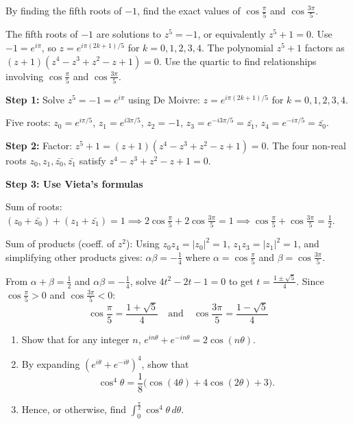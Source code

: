 \begin{problem}
By finding the fifth roots of $-1$, find the exact values of $\cos\frac{\pi}{5}$ and $\cos\frac{3\pi}{5}$.
\end{problem}

\begin{hint}
The fifth roots of $-1$ are solutions to $z^5 = -1$, or equivalently $z^5 + 1 = 0$. Use $-1 = e^{i\pi}$, so $z = e^{i\pi(2k+1)/5}$ for $k = 0, 1, 2, 3, 4$. The polynomial $z^5 + 1$ factors as $(z+1)(z^4 - z^3 + z^2 - z + 1) = 0$. Use the quartic to find relationships involving $\cos\frac{\pi}{5}$ and $\cos\frac{3\pi}{5}$.
\end{hint}

\begin{solution}[Sketch]
\textbf{Step 1:} Solve $z^5=-1=e^{i\pi}$ using De Moivre: $z=e^{i\pi(2k+1)/5}$ for $k=0,1,2,3,4$.

Five roots: $z_0=e^{i\pi/5}$, $z_1=e^{i3\pi/5}$, $z_2=-1$, $z_3=e^{-i3\pi/5}=\bar{z_1}$, $z_4=e^{-i\pi/5}=\bar{z_0}$.

\textbf{Step 2:} Factor: $z^5+1=(z+1)(z^4-z^3+z^2-z+1)=0$. The four non-real roots $z_0,z_1,\bar{z_0},\bar{z_1}$ satisfy $z^4-z^3+z^2-z+1=0$.

\textbf{Step 3: Use Vieta's formulas}

Sum of roots: $(z_0+\bar{z_0})+(z_1+\bar{z_1})=1 \implies 2\cos\frac{\pi}{5}+2\cos\frac{3\pi}{5}=1 \implies \cos\frac{\pi}{5}+\cos\frac{3\pi}{5}=\frac{1}{2}$.

Sum of products (coeff. of $z^2$): Using $z_0z_4=|z_0|^2=1$, $z_1z_3=|z_1|^2=1$, and simplifying other products gives: $\alpha\beta=-\frac{1}{4}$ where $\alpha=\cos\frac{\pi}{5}$ and $\beta=\cos\frac{3\pi}{5}$.

From $\alpha+\beta=\frac{1}{2}$ and $\alpha\beta=-\frac{1}{4}$, solve $4t^2-2t-1=0$ to get $t=\frac{1\pm\sqrt{5}}{4}$. Since $\cos\frac{\pi}{5}>0$ and $\cos\frac{3\pi}{5}<0$:
\[
\boxed{\cos\frac{\pi}{5} = \frac{1+\sqrt{5}}{4}} \quad \text{and} \quad \boxed{\cos\frac{3\pi}{5} = \frac{1-\sqrt{5}}{4}}
\]
\end{solution}

\begin{problem}
\begin{enumerate}[label=(\roman*),leftmargin=*]
    \item Show that for any integer $n$, $e^{in\theta} + e^{-in\theta} = 2\cos(n\theta)$.
    \item By expanding $\left(e^{i\theta} + e^{-i\theta}\right)^4$, show that
    \[
    \cos^4 \theta = \frac{1}{8} \big( \cos(4\theta) + 4\cos(2\theta) + 3 \big).
    \]
    \item Hence, or otherwise, find $\displaystyle \int_{0}^{\frac{\pi}{2}} \cos^4 \theta \, d\theta$.
\end{enumerate}
\end{problem}

